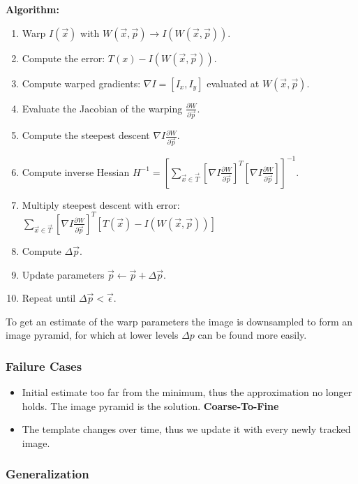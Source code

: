 \documentclass[10pt,a4paper]{scrartcl}
\begin{document}
\begin{multicols*}{2}
\textbf{Algorithm:}
\begin{enumerate}
\item Warp $I(\vec{x})$ with $W(\vec{x},\vec{p})\rightarrow I(W(\vec{x},\vec{p}))$.
\item Compute the error: $T(x)-I(W(\vec{x},\vec{p}))$.
\item Compute warped gradients: $\nabla I=\left[I_x,I_y\right]$ evaluated at $W(\vec{x},\vec{p})$.
\item Evaluate the Jacobian of the warping $\frac{\partial W}{\partial \vec{p}}$.
\item Compute the steepest descent $\nabla I\frac{\partial W}{\partial\vec{p}}$.
\item Compute inverse Hessian $H^{-1}=\left[\sum\limits_{\vec{x}\in\vec{T}}\left[\nabla I\frac{\partial W}{\partial \vec{p}}\right]^T\left[\nabla I\frac{\partial W}{\partial\vec{p}}\right]\right]^{-1}$.
\item Multiply steepest descent with error: $\sum\limits_{\vec{x}\in\vec{T}}\left[\nabla I\frac{\partial W}{\partial\vec{p}}\right]^T\left[T(\vec{x})-I(W(\vec{x},\vec{p}))\right]$
\item Compute $\Delta \vec{p}$.
\item Update parameters $\vec{p}\leftarrow \vec{p}+\Delta\vec{p}$.
\item Repeat until $\Delta\vec{p}<\vec{\epsilon}$.
\end{enumerate}


To get an estimate of the warp parameters the image is downsampled to form an image pyramid, for which at lower levels $\Delta p$ can be found more easily.


\subsubsection{Failure Cases}

\begin{itemize}
\item Initial estimate too far from the minimum, thus the approximation no longer holds. The image pyramid is the solution. \textbf{Coarse-To-Fine}
\item The template changes over time, thus we update it with every newly tracked image.
\end{itemize}

\subsubsection{Generalization}


\end{multicols*}
\end{document}
